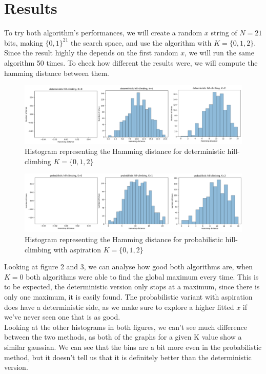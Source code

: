 \documentclass[a4paper]{article}
\begin{document}
\section{Results}
To try both algorithm's performances, we will create a random $x$ string of $N=21$ bits, making $\{0,1\}^{21}$ the search space, and use the algorithm with $K = \{0,1,2\}$. Since the result highly the depends on the first random $x$, we will run the same algorithm 50 times. To check how different the results were, we will compute the hamming distance between them.
\begin{figure}[H]
\center
\includegraphics[width=1\textwidth]{images/hill_climb_deter.PNG}
\caption{Histogram representing the Hamming distance for deterministic hill-climbing $K=\{0,1,2\}$}
\end{figure}

\begin{figure}[H]
\center
\includegraphics[width=1\textwidth]{images/hill_climb_proba.PNG}
\caption{Histogram representing the Hamming distance for probabilistic hill-climbing with aspiration $K=\{0,1,2\}$}
\end{figure}


Looking at figure 2 and 3, we can analyse how good both algorithms are, when $K=0$ both algorithms were able to find the global maximum every time. This is to be expected, the deterministic version only stops at a maximum, since there is only one maximum, it is easily found. The probabilistic variant with aspiration does have a deterministic side, as we make sure to explore a higher fitted $x$ if we've never seen one that is as good.\\

Looking at the other histograms in both figures, we can't see much difference between the two methods, as both of the graphs for a given K value show a similar gaussian. We can see that the bins are a bit more even in the probabilistic method, but it doesn't tell us that it is definitely better than the deterministic version.\\
\end{document}
